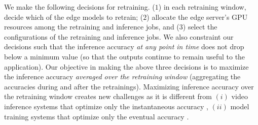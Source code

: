 
We make the following decisions for retraining. %
($1$) in each retraining window, decide which of the edge models to retrain;  
($2$) allocate the edge server's GPU resources among the retraining and inference jobs, and 
($3$) select the configurations of the retraining and inference jobs. %
We also constraint our decisions such that the inference accuracy {\em at any point in time} does not drop below a minimum value (so that the outputs continue to remain useful to the application). 
Our objective in making the above three decisions is to maximize the inference accuracy {\em averaged over the retraining window} (aggregating the accuracies during and after the retrainings). %
Maximizing inference accuracy over the retraining window creates new challenges as it is different from $(i)$ video inference systems that optimize only the instantaneous accuracy \cite{videostorm, noscope, chameleon}, $(ii)$  model training systems that optimize only the eventual accuracy \cite{hyperparameter-16, DBLP:journals/jmlr/BergstraB12, snoek2012practical, Swersky_scalablebayesian, DBLP:conf/osdi/XiaoBRSKHPPZZYZ18, optimus}.%

